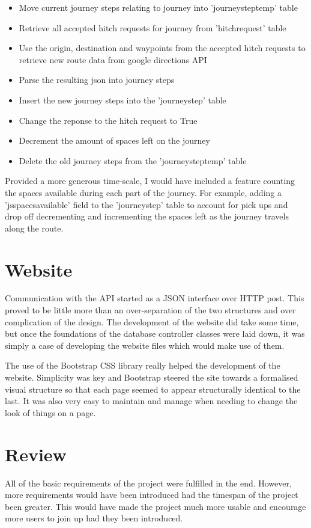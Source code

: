 \begin{itemize}
\item Move current journey steps relating to journey into 'journey\textunderscore step\textunderscore temp' table
\item Retrieve all accepted hitch requests for journey from 'hitch\textunderscore request' table
\item Use the origin, destination and waypoints from the accepted hitch requests to retrieve new route data from google directions API
\item Parse the resulting json into journey steps
\item Insert the new journey steps into the 'journey\textunderscore step' table
\item Change the reponse to the hitch request to True
\item Decrement the amount of spaces left on the journey
\item Delete the old journey steps from the 'journey\textunderscore step\textunderscore temp' table
\end{itemize}

Provided a more generous time-scale, I would have included a feature counting the spaces available during each part of the journey. For example, adding a 'js\textunderscore spaces\textunderscore available' field to the 'journey\textunderscore step' table to account for pick ups and drop off decrementing and incrementing the spaces left as the journey travels along the route.
	
\section{Website}
	Communication with the API started as a JSON interface over HTTP post. This proved to be little more than an over-separation of the two structures and over complication of the design. The development of the website did take some time, but once the foundations of the database controller classes were laid down, it was simply a case of developing the website files which would make use of them.
	
	The use of the Bootstrap CSS library really helped the development of the website. Simplicity was key and Bootstrap steered the site towards a formalised visual structure so that each page seemed to appear structurally identical to the last. It was also very easy to maintain and manage when needing to change the look of things on a page.

\section{Review}
	All of the basic requirements of the project were fulfilled in the end. However, more requirements would have been introduced had the timespan of the project been greater. This would have made the project much more usable and encourage more users to join up had they been introduced.

